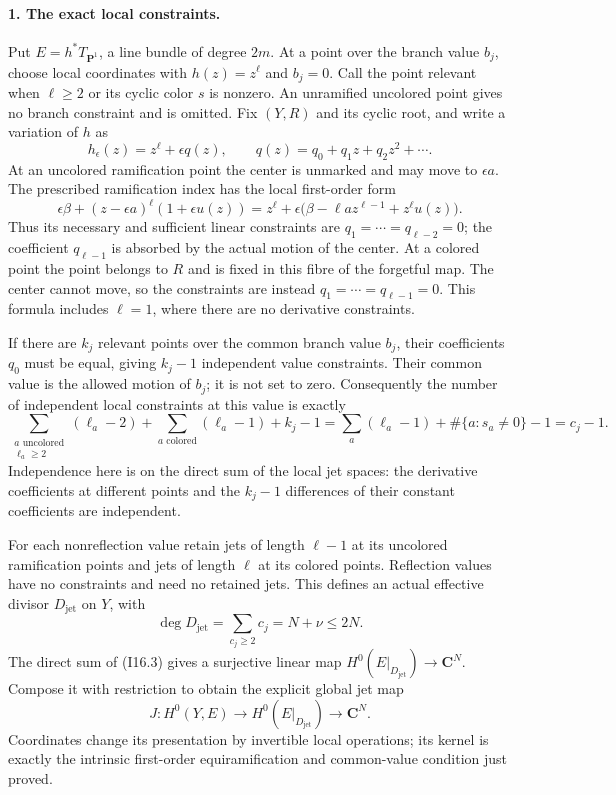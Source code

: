 \paragraph{1. The exact local constraints.}
Put $E=h^*T_{\mathbf P^1}$, a line bundle of degree $2m$.
At a point over the branch value $b_j$, choose local coordinates
with $h(z)=z^\ell$ and $b_j=0$.  Call the point relevant when
$\ell\geq2$ or its cyclic color $s$ is nonzero.  An unramified
uncolored point gives no branch constraint and is omitted.
Fix $(Y,R)$ and its cyclic root, and write a variation of $h$ as
\[
       h_\epsilon(z)=z^\ell+\epsilon q(z),\qquad
       q(z)=q_0+q_1z+q_2z^2+\cdots.
\]
At an uncolored ramification point the center is unmarked and
may move to $\epsilon a$.  The prescribed ramification index has
the local first-order form
\[
 \epsilon\beta+(z-\epsilon a)^\ell(1+\epsilon u(z))
   =z^\ell+\epsilon\bigl(\beta-\ell a z^{\ell-1}
                                      +z^\ell u(z)\bigr).
\]
Thus its necessary and sufficient linear constraints are
$q_1=\cdots=q_{\ell-2}=0$; the coefficient $q_{\ell-1}$ is absorbed
by the actual motion of the center.  At a colored point the point
belongs to $R$ and is fixed in this fibre of the forgetful map.
The center cannot move, so the constraints are instead
$q_1=\cdots=q_{\ell-1}=0$.  This formula includes $\ell=1$,
where there are no derivative constraints.

If there are $k_j$ relevant points over the common branch value
$b_j$, their coefficients $q_0$ must be equal, giving $k_j-1$
independent value constraints.  Their common value is the allowed
motion of $b_j$; it is not set to zero.  Consequently the number
of independent local constraints at this value is exactly
\[
 \sum_{\substack{a\text{ uncolored}\\\ell_a\geq2}}(\ell_a-2)
 +\sum_{a\text{ colored}}(\ell_a-1)+k_j-1
       =\sum_a(\ell_a-1)+\#\{a:s_a\ne0\}-1
       =c_j-1.                                      \tag{I16.3}
\]
Independence here is on the direct sum of the local jet spaces:
the derivative coefficients at different points and the
$k_j-1$ differences of their constant coefficients are independent.

For each nonreflection value retain jets of length $\ell-1$
at its uncolored ramification points and jets of length $\ell$
at its colored points.  Reflection values have no constraints
and need no retained jets.  This defines an actual effective
divisor $D_{\mathrm{jet}}$ on $Y$, with
\begin{equation}
 \deg D_{\mathrm{jet}}
       =\sum_{c_j\geq2}c_j=N+\nu\leq2N.             \tag{I16.4}
\end{equation}
The direct sum of (I16.3) gives a surjective linear map
$H^0(E|_{D_{\mathrm{jet}}})\to\mathbf C^N$.
Compose it with restriction to obtain the explicit global jet map
\begin{equation}
 J:H^0(Y,E)\longrightarrow H^0(E|_{D_{\mathrm{jet}}})
                         \longrightarrow\mathbf C^N.
                                                       \tag{I16.5}
\end{equation}
Coordinates change its presentation by invertible local operations;
its kernel is exactly the intrinsic first-order equiramification
and common-value condition just proved.

